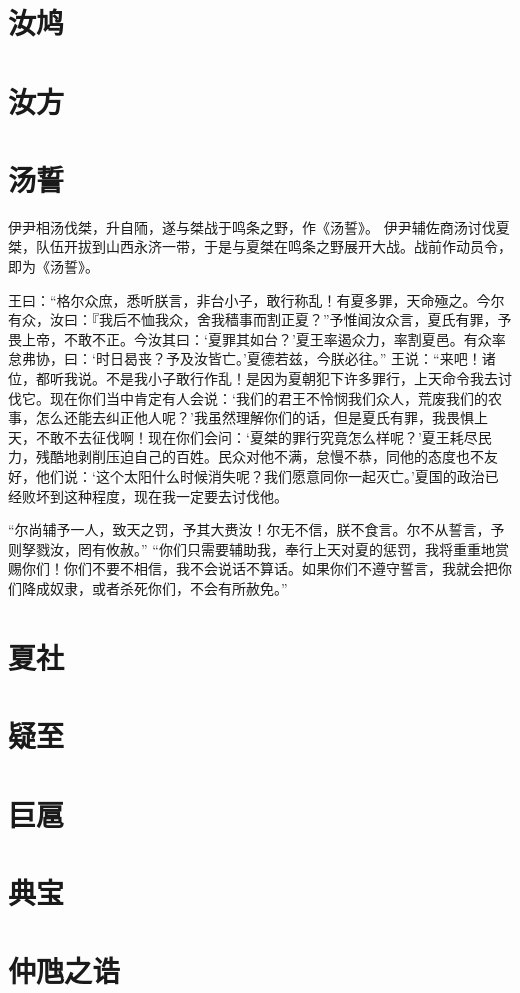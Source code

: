 \documentclass[a4paper,12pt,UTF8,twoside]{ctexbook}
\begin{document}
\chapter{汝鸠}
\chapter{汝方}
\chapter{汤誓}

伊尹相汤伐桀，升自陑，遂与桀战于鸣条之野，作《汤誓》。
伊尹辅佐商汤讨伐夏桀，队伍开拔到山西永济一带，于是与夏桀在鸣条之野展开大战。战前作动员令，即为《汤誓》。

王曰：“格尔众庶，悉听朕言，非台小子，敢行称乱！有夏多罪，天命殛之。今尔有众，汝曰：『我后不恤我众，舍我穑事而割正夏？”予惟闻汝众言，夏氏有罪，予畏上帝，不敢不正。今汝其曰：‘夏罪其如台？’夏王率遏众力，率割夏邑。有众率怠弗协，曰：‘时日曷丧？予及汝皆亡。’夏德若兹，今朕必往。”
王说：“来吧！诸位，都听我说。不是我小子敢行作乱！是因为夏朝犯下许多罪行，上天命令我去讨伐它。现在你们当中肯定有人会说：‘我们的君王不怜悯我们众人，荒废我们的农事，怎么还能去纠正他人呢？’我虽然理解你们的话，但是夏氏有罪，我畏惧上天，不敢不去征伐啊！现在你们会问：‘夏桀的罪行究竟怎么样呢？’夏王耗尽民力，残酷地剥削压迫自己的百姓。民众对他不满，怠慢不恭，同他的态度也不友好，他们说：‘这个太阳什么时候消失呢？我们愿意同你一起灭亡。’夏国的政治已经败坏到这种程度，现在我一定要去讨伐他。

“尔尚辅予一人，致天之罚，予其大赉汝！尔无不信，朕不食言。尔不从誓言，予则孥戮汝，罔有攸赦。”
“你们只需要辅助我，奉行上天对夏的惩罚，我将重重地赏赐你们！你们不要不相信，我不会说话不算话。如果你们不遵守誓言，我就会把你们降成奴隶，或者杀死你们，不会有所赦免。”
\chapter{夏社}
\chapter{疑至}
\chapter{巨扈}
\chapter{典宝}

\chapter{仲虺之诰}
\end{document}
